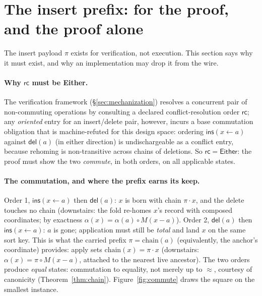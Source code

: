 \documentclass[11pt]{article}
\newcommand{\del}{\mathsf{del}}
\newcommand{\ins}{\mathsf{ins}}
\newcommand{\rc}{\mathsf{rc}}
\newcommand{\Either}{\textsf{Either}}
\newcommand{\chain}{\mathrm{chain}}
\begin{document}
\section{The insert prefix: for the proof, and the proof alone}
\label{sec:prefix}

The insert payload $\pi$ exists for verification, not execution.
This section says why it must exist, and why an implementation may
drop it from the wire.

\paragraph{Why $\rc$ must be \Either.} The verification framework
(\S\ref{sec:mechanization}) resolves a concurrent pair of
non-commuting operations by consulting a declared
conflict-resolution order $\rc$; any \emph{oriented} entry for an
insert/delete pair, however, incurs a base commutation obligation
that is machine-refuted for this design space: ordering
$\ins(x \leftarrow a)$ against $\del(a)$ (in either direction) is
undischargeable as a conflict entry, because rehoming is
non-transitive across chains of deletions. So $\rc = \Either$: the
proof must show the two \emph{commute}, in both orders, on all
applicable states.

\paragraph{The commutation, and where the prefix earns its keep.}
Order 1, $\ins(x \leftarrow a)$ then $\del(a)$: $x$ is born with
chain $\pi \cdot x$, and the delete touches no chain (downstairs: the
fold re-homes $x$'s record with composed coordinates; by exactness
$\alpha(x) = \alpha(a) \circ M(x - a)$). Order 2, $\del(a)$ then
$\ins(x \leftarrow a)$: $a$ is gone; application must still be
\emph{total} and land $x$ on the same sort key. This is what the
carried prefix $\pi = \chain(a)$ (equivalently, the anchor's
coordinate) provides: apply sets
$\chain(x) = \pi \cdot x$ (downstairs:
$\alpha(x) = \pi \circ M(x - a)$, attached to the nearest live
ancestor). The two orders produce \emph{equal} states: commutation
to equality, not merely up to $\approx$, courtesy of canonicity
(Theorem~\ref{thm:chain}). Figure~\ref{fig:commute} draws the square
on the smallest instance.
\end{document}
